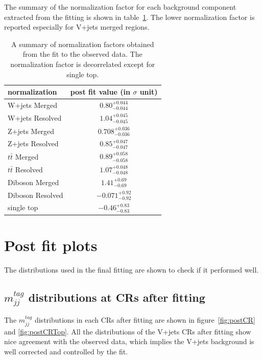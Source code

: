 The summary of the normalization factor for each background component extracted from the fitting is shown in table~\ref{tab:postnorm}. 
The lower normalization factor is reported especially for V+jets merged regions. 
\begin{table}[htbp]
\begin{center}
\begin{tabular}{|l|c|}
\hline
normalization & post fit value (in $\sigma$ unit) \\\hline
W+jets Merged & $0.80^{+0.044}_{-0.044}$ \\
W+jets Resolved & $1.04^{+0.045}_{-0.045}$ \\
Z+jets Merged & $0.708^{+0.036}_{-0.036}$ \\
Z+jets Resolved & $0.85^{+0.047}_{-0.047}$ \\
$t\bar{t}$ Merged & $0.89^{+0.058}_{-0.058}$ \\
$t\bar{t}$ Resolved & $1.07^{+0.048}_{-0.048}$ \\
Diboson Merged & $1.41^{+0.69}_{-0.69}$ \\
Diboson Resolved & $-0.071^{+0.92}_{-0.92}$ \\
single top & $-0.46^{+0.83}_{-0.83}$ \\
\hline
\end{tabular}
\caption{\label{tab:postnorm} A summary of normalization factors obtained from the fit to the observed data. The normalization factor is decorrelated except for single top. }
\end{center}
\end{table}

\section{Post fit plots}
\label{sec:postfitplots}
The distributions used in the final fitting are shown to check if it performed well.
\subsection{ $m^{tag}_{jj}$ distributions at CRs after fitting }
The $m^{tag}_{jj}$ distributions in each CRs after fitting are shown in figure~\ref{fig:postCR} and \ref{fig:postCRTop}.
All the distributions of the V+jets CRs after fitting show nice agreement with the observed data, which implies the V+jets background is well corrected and controlled by the fit.

